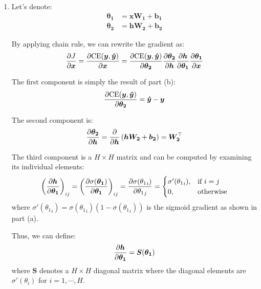 \documentclass[10pt,reqno]{amsart}
\begin{document}
\begin{enumerate}[topsep=0pt,itemsep=2ex,partopsep=1ex,parsep=1ex]
\begin{enumerate}
  \item
    Let's denote:
    \begin{align*}
      \bm{\theta_1} &= \bm{x W_1} + \bm{b_1} \\
      \bm{\theta_2} &= \bm{h W_2} + \bm{b_2}
    \end{align*}
    
    By applying chain rule, we can rewrite the gradient as:
    \begin{equation*}
      \frac{\partial J}{\partial \bm{x}}
      = \frac{\partial \text{CE}(\bm{y}, \bm{\hat{y}})}{\partial \bm{x}}
      = \frac{\partial \text{CE}(\bm{y}, \bm{\hat{y}})}{\partial \bm{\theta_2}} \frac{\partial \bm{\theta_2}}{\partial \bm{h}} \frac{\partial \bm{h}}{\partial \bm{\theta_1}} \frac{\partial \bm{\theta_1}}{\partial \bm{x}}
    \end{equation*}
    
    The first component is simply the result of part (b):
    \begin{equation*}
      \frac{\partial \text{CE}(\bm{y}, \bm{\hat{y}})}{\partial \bm{\theta_2}} = \bm{\hat{y}} - \bm{y}
    \end{equation*}
    
    The second component is:
    \begin{equation*}
      \frac{\partial \bm{\theta_2}}{\partial \bm{h}} = \frac{\partial}{\partial \bm{h}} \left( \bm{h W_2} + \bm{b_2} \right) = \bm{W_2}^\top
    \end{equation*}

    The third component is a $H \times H$ matrix
    and can be computed by examining its individual elements:
    \begin{equation*}
      \left( \frac{\partial \bm{h}}{\partial \bm{\theta_1}} \right)_{ij}
      = \left( \frac{\partial \sigma(\bm{\theta_1})}{\partial \bm{\theta_1}} \right)_{ij} 
      = \frac{\partial \sigma({\theta_1}_i)}{\partial {\theta_1}_j} = 
      \begin{cases}
        \sigma'({\theta_1}_i), & \text{if}\ i=j \\
        0, & \text{otherwise}
      \end{cases}
    \end{equation*}
    where $\sigma'({\theta_1}_i) = \sigma({\theta_1}_i) \left( 1 - \sigma({\theta_1}_i) \right)$
    is the sigmoid gradient as shown in part (a).

    Thus, we can define: 
    \begin{equation*}
      \frac{\partial \bm{h}}{\partial \bm{\theta_1}} = \bm{S}(\bm{\theta_1})
    \end{equation*}
    where $\bm{S}$ denotes a $H \times H$ diagonal matrix where 
    the diagonal elements are $\sigma'(\theta_i)$ for $i = 1, \cdots, H$.


\end{enumerate}
\end{enumerate}
\end{document}
